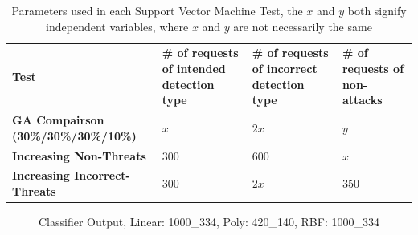 \begin{table}
	\begin{tabular}{|p{2.0in}|p{1.125in}|p{1.125in}|p{1.125in}|}
	\hline
	\textbf{Test} & \textbf{\# of requests of intended detection type} & \textbf{\# of requests of incorrect detection type} & \textbf{\# of requests of non-attacks} \\
	\hhline{|=|=|=|=|}
	\textbf{GA Compairson (30\%/30\%/30\%/10\%)} & \textbf{$x$} & \textbf{$2x$} & \textbf{$y$} \\
	\hline
	\textbf{Increasing Non-Threats} & 300 & 600 & \textbf{$x$} \\
	\hline
	\textbf{Increasing Incorrect-Threats} & 300 & \textbf{$2x$} & 350 \\
	\hline
	\end{tabular}
	\caption{Parameters used in each Support Vector Machine Test, the \textbf{$x$} and \textbf{$y$} both signify independent variables, where \textbf{$x$} and \textbf{$y$} are not necessarily the same}
	\label{tab:svmTestParameters}
\end{table}

\begin{figure}[hb]
	\centering
	\caption{Classifier Output, Linear: 1000\_334, Poly: 420\_140, RBF: 1000\_334}
	\label{fig:resClassifiers}
\end{figure}

